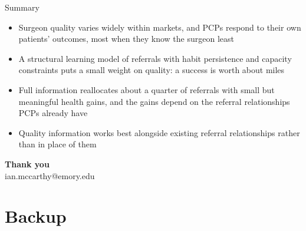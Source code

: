 \documentclass[aspectratio=169,11pt]{beamer}
\begin{document}
\begin{frame}{Summary}
  \begin{itemize}\setlength{\itemsep}{10pt}
    \item Surgeon quality varies widely within markets, and PCPs respond to their own patients' outcomes, most when they know the surgeon least
    \item A structural learning model of referrals with habit persistence and capacity constraints puts a small weight on quality: a success is worth about \alphaDistRatioMyopic{} miles
    \item Full information reallocates about a quarter of referrals with small but meaningful health gains, and the gains depend on the referral relationships PCPs already have
    \item Quality information works best alongside existing referral relationships rather than in place of them
  \end{itemize}
\end{frame}

\begin{frame}[c]
  \begin{center}
    {\LARGE\bfseries\color{emoryBlue}Thank you}\\[16pt]
    {\large\color{emoryDark}ian.mccarthy@emory.edu}
  \end{center}
\end{frame}


\section{Backup}
\sectionframe
\end{document}
